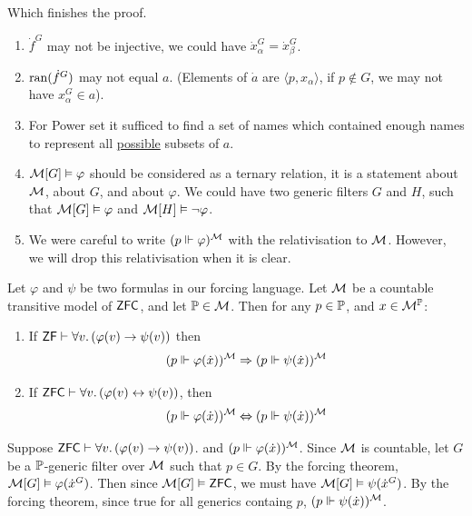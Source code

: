 \documentclass{article}
\begin{document}
    Which finishes the proof. \endproof
    \begin{remark*}\hspace{0.1cm}
        \begin{enumerate}
            \item $\dot{f}^{G}$ may not be injective, we could have $\dot{x}_{\alpha}^{G} = \dot{x}_{\beta}^{G}$.
            \item $\operatorname{ran}(\dot{f}^{G})$ may not equal $a$. (Elements of $\dot{a}$ are $\langle p, x_{\alpha} \rangle$, if $p \notin G$, we may not have $x_{\alpha}^{G} \in a$).
            \item For Power set it sufficed to find a set of names which contained enough names to represent all \underline{possible} subsets of $a$.
            \item $\mathcal{M}[G] \vDash \varphi$ should be considered as a ternary relation, it is a statement about $\mathcal{M}$, about $G$, and about $\varphi$. We could have two generic filters $G$ and $H$, such that $\mathcal{M}[G] \vDash \varphi$ and $\mathcal{M}[H] \vDash \neg \varphi$.
            \item We were careful to write $(p \Vdash \varphi)^{\mathcal{M}}$ with the relativisation to $\mathcal{M}$. However, we will drop this relativisation when it is clear.
        \end{enumerate}
    \end{remark*}
























    \newlec
    \begin{fancylem}{}
        Let $\varphi$ and $\psi$ be two formulas in our forcing language. Let $\mathcal{M}$ be a countable transitive model of $\mathsf{ZFC}$, and let $\mathbb{P} \in \mathcal{M}$. Then for any $p \in \mathbb{P}$, and $x \in \mathcal{M}^{\mathbb{P}}$: \begin{enumerate}
            \item[(i)] If $\mathsf{ZF} \vdash \forall v. \, (\varphi(v) \rightarrow \psi(v))$ then \[ (p \Vdash \varphi(\dot{x}))^{\mathcal{M}} \Rightarrow (p \Vdash \psi(\dot{x}))^{\mathcal{M}}\]
            \item[(ii)] If $\mathsf{ZFC} \vdash \forall v. \, (\varphi(v) \leftrightarrow \psi(v))$, then \[ (p \Vdash \varphi(\dot{x}))^{\mathcal{M}} \Leftrightarrow (p \Vdash \psi(\dot{x}))^{\mathcal{M}}\]
        \end{enumerate}
    \end{fancylem}
    \proof Suppose $\mathsf{ZFC} \vdash \forall v. \, (\varphi(v) \rightarrow \psi(v))$. and $(p \Vdash \varphi(\dot{x}))^{\mathcal{M}}$. Since $\mathcal{M}$ is countable, let $G$ be a $\mathbb{P}$-generic filter over $\mathcal{M}$ such that $p \in G$. By the forcing theorem, $\mathcal{M}[G] \vDash \varphi(\dot{x}^{G})$. Then since $\mathcal{M}[G] \vDash \mathsf{ZFC}$, we must have $\mathcal{M}[G] \vDash \psi(\dot{x}^{G})$. By the forcing theorem, since true for all generics containg $p$, $(p \Vdash \psi(\dot{x}))^{\mathcal{M}}$. \endproof
\end{document}
